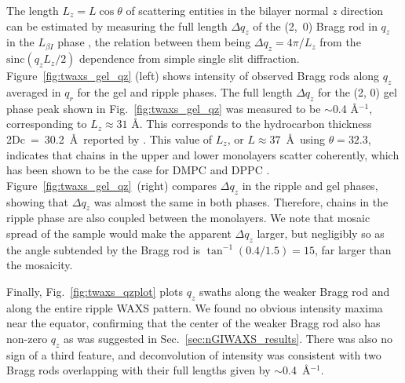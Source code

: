 The length $L_z=L\cos\theta$ of scattering entities in the bilayer normal $z$ direction can be estimated by 
measuring the full length $\Delta q_z$ of the (2,~0) Bragg rod in $q_z$ in
the $L_{\beta I}$ phase \cite{ref:Tristram93},
the relation between them being $\Delta q_z = 4\pi/L_z$ 
from the $\textrm{sinc}(q_zL_z/2)$ dependence from simple single slit 
diffraction. 
Figure~\ref{fig:twaxs_gel_qz} (left) shows intensity of observed Bragg rods along $q_z$ averaged in $q_r$
for the gel and ripple phases. The full length $\Delta q_z$ for the (2, 0) gel
phase peak shown in Fig.~\ref{fig:twaxs_gel_qz} was measured to be 
$\sim$0.4 \AA$^{-1}$, corresponding to 
$L_z \approx 31$ \AA. 
This corresponds to the hydrocarbon thickness 2\gls{Dc}~=~30.2~\AA\  
reported by \cite{Tristram-Nagle02}. 
This value of $L_z$, or $L\approx 37$~\AA\ using $\theta=32.3$\textdegree,
indicates that chains in the upper and
lower monolayers scatter coherently, which has been shown to be the case
for DMPC \cite{ref:Smith88} and DPPC \cite{ref:Tristram93}.
Figure~\ref{fig:twaxs_gel_qz}~(right) compares $\Delta q_z$ in the ripple and gel phases,
showing that $\Delta q_z$ was almost the same in both phases. Therefore, 
chains in the ripple phase are also coupled between the monolayers. 
We note that mosaic spread of the sample would make the apparent $\Delta q_z$ 
larger, but negligibly so as the angle subtended by the Bragg rod is $\tan^{-1}(0.4/1.5)=15$\textdegree, 
far larger than the mosaicity.

Finally, Fig.~\ref{fig:twaxs_qzplot} plots $q_z$ swaths along the weaker 
Bragg rod and along the entire ripple WAXS pattern. 
We found no obvious intensity maxima
near the equator, confirming that the center of the weaker Bragg rod also 
has non-zero $q_z$ as was suggested in Sec.~\ref{sec:nGIWAXS_results}.
There was also no sign of a third feature, and deconvolution of intensity
was consistent with two Bragg rods overlapping 
with their full lengths given by $\sim$0.4~\AA$^{-1}$.

